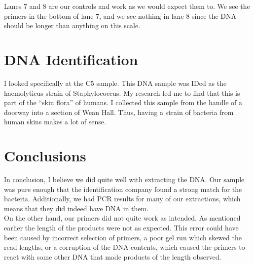 \documentclass[a4paper]{article}
\begin{document}
Lanes 7 and 8 are our controls and work as we would expect them to. We see the primers in the bottom of lane 7, and we see nothing in lane 8 since the DNA should be longer than anything on this scale.\\

\section{DNA Identification}

I looked specifically at the C5 sample. This DNA sample was IDed as the haemolyticus strain of Staphylococcus. My research led me to find that this is part of the ``skin flora'' of humans. I collected this sample from the handle of a doorway into a section of Wean Hall. Thus, having a strain of bacteria from human skins makes a lot of sense.

\section{Conclusions}

In conclusion, I believe we did quite well with extracting the DNA. Our sample was pure enough that the identification company found a strong match for the bacteria. Additionally, we had PCR results for many of our extractions, which means that they did indeed have DNA in them.\\

On the other hand, our primers did not quite work as intended. As mentioned earlier the length of the products were not as expected. This error could have been caused by incorrect selection of primers, a poor gel run which skewed the read lengths, or a corruption of the DNA contents, which caused the primers to react with some other DNA that made products of the length observed.
\end{document}
